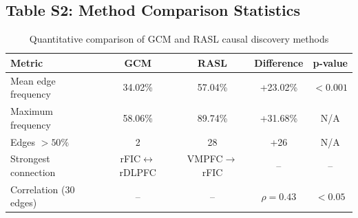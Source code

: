 \subsection*{Table S2: Method Comparison Statistics}
\begin{table}[h]
\centering
\caption{Quantitative comparison of GCM and RASL causal discovery methods}
\begin{tabular}{lcccc}
\hline
Metric & GCM & RASL & Difference & p-value \\
\hline
Mean edge frequency & 34.02\% & 57.04\% & +23.02\% & $<0.001$ \\
Maximum frequency & 58.06\% & 89.74\% & +31.68\% & N/A \\
Edges $>50\%$ & 2 & 28 & +26 & N/A \\
Strongest connection & rFIC$\leftrightarrow$rDLPFC & VMPFC$\rightarrow$rFIC & -- & -- \\
Correlation (30 edges) & -- & -- & $\rho=0.43$ & $<0.05$ \\
\hline
\end{tabular}
\end{table}


